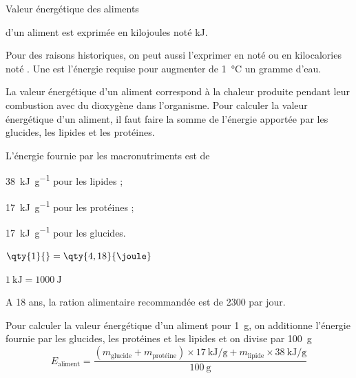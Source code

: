 \pasCorrection{\newpage\vspace*{-36pt}}
\begin{doc}{Valeur énergétique des aliments}
  \begin{importants}  
     d'un aliment est exprimée en kilojoules noté \unit{\kilo\joule}.
  \end{importants}
  Pour des raisons historiques, on peut aussi l'exprimer en  noté \unit{\cal} ou en kilocalories noté \unit{\kcal}.
  Une  est l'énergie requise pour augmenter de \qty{1}{\degreeCelsius} un gramme d'eau.

  La valeur énergétique d'un aliment correspond à la chaleur produite pendant leur combustion avec du dioxygène dans l'organisme.
  Pour calculer la valeur énergétique d'un aliment, il faut faire la somme de l'énergie apportée par les glucides, les lipides et les protéines.
  
  \begin{importants}
    L'énergie fournie par les macronutriments est de
    \begin{listePoints}[2]
      \item \qty{38}{\kilo\joule\per\g} pour les lipides ;
      \item \qty{17}{\kilo\joule\per\g} pour les protéines ;
      \item \qty{17}{\kilo\joule\per\g} pour les glucides.
    \end{listePoints}
  \end{importants}

  \begin{donnees}[2]
    \item $\qty{1}{\cal} = \qty{4,18}{\joule}$
    \item $\qty{1}{\kilo\joule} = \qty{1000}{\joule}$
    \item A 18 ans, la ration alimentaire recommandée est de \qty{2300}{\kcal} par jour.
  \end{donnees}
  \vspace*{-12pt}
  Pour calculer la valeur énergétique d'un aliment pour \qty{1}{\g}, on additionne l'énergie fournie par les glucides, les protéines et les lipides et on divise par \qty{100}{\g}
  \vspace*{-4pt}
  \begin{equation*}
    E_\text{aliment} 
    = \dfrac {(m_\text{glucide} + m_\text{protéine}) \times \qty{17}{\kilo\joule\per\g}
    +  m_\text{lipide} \times \qty{38}{\kilo\joule\per\g}} {\qty{100}{\g}}
  \end{equation*}
\end{doc}

